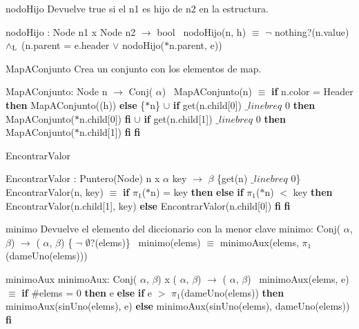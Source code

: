 \begin{DoxyParagraph}{nodo\+Hijo}
Devuelve true si el n1 es hijo de n2 en la estructura.

nodo\+Hijo \+: Node n1 x Node n2 $\to$ bool~\newline
 nodo\+Hijo(n, h) $\equiv$ $\lnot$ nothing?(n.\+value) $\land_{\rm L}$ (n.\+parent = e.\+header $\lor$ nodo\+Hijo($\ast$n.parent, e)) 
\end{DoxyParagraph}


\begin{DoxyParagraph}{Map\+A\+Conjunto}
Crea un conjunto con los elementos de map.

Map\+A\+Conjunto\+: Node n $\to$ Conj( $\alpha$)~\newline
 Map\+A\+Conjunto(n) $\equiv$ {\bfseries if} n.\+color = Header {\bfseries then} Map\+A\+Conjunto((h)) {\bfseries else} \{$\ast$n\} $\cup$ {\bfseries if} get(n.\+child\mbox{[}0\mbox{]}) $\_linebr eq$ 0 {\bfseries then} Map\+A\+Conjunto($\ast$n.child\mbox{[}0\mbox{]}) {\bfseries fi} $\cup$ {\bfseries if} get(n.\+child\mbox{[}1\mbox{]}) $\_linebr eq$ 0 {\bfseries then} Map\+A\+Conjunto($\ast$n.child\mbox{[}1\mbox{]}) {\bfseries fi} {\bfseries fi} 
\end{DoxyParagraph}


\begin{DoxyParagraph}{Encontrar\+Valor}


Encontrar\+Valor \+: Puntero(\+Node) n x $\alpha$ key $\to$ $\beta$ \{get(n) $\_linebr eq$ 0\}~\newline
 Encontrar\+Valor(n, key) $\equiv$ {\bfseries if} $\pi_1$($\ast$n) = key {\bfseries then}  {\bfseries else} {\bfseries if} $\pi_1$($\ast$n) $<$ key {\bfseries then} Encontrar\+Valor(n.\+child\mbox{[}1\mbox{]}, key) {\bfseries else} Encontrar\+Valor(n.\+child\mbox{[}0\mbox{]}) {\bfseries fi} {\bfseries fi} 
\end{DoxyParagraph}


\begin{DoxyParagraph}{minimo}
Devuelve el elemento del diccionario con la menor clave minimo\+: Conj( $\alpha$, $\beta$) $\to$ ( $\alpha$, $\beta$) \{ $\lnot$ $\emptyset$?(elems)\}~\newline
 minimo(elems) $\equiv$ minimo\+Aux(elems, $\pi_1$(dame\+Uno(elems))) 
\end{DoxyParagraph}


\begin{DoxyParagraph}{minimo\+Aux}
minimo\+Aux\+: Conj( $\alpha$, $\beta$) x ( $\alpha$, $\beta$) $\to$ ( $\alpha$, $\beta$)~\newline
 minimo\+Aux(elems, e) $\equiv$ {\bfseries if} \#elems = 0 {\bfseries then} e {\bfseries else} {\bfseries if} e $>$ $\pi_1$(dame\+Uno(elems)) {\bfseries then} minimo\+Aux(sin\+Uno(elems), e) {\bfseries else} minimo\+Aux(sin\+Uno(elems), dame\+Uno(elems)) {\bfseries fi} 
\end{DoxyParagraph}


